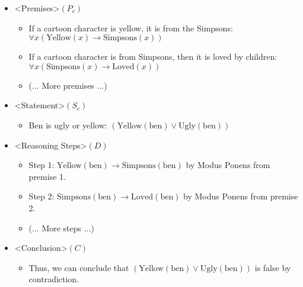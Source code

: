 \documentclass[10pt,a4paper]{article}
\begin{document}
\begin{multicols}{2}
{\begin{minipage}{9cm}
\begin{itemize}
    \item \textless Premises\textgreater $(P_c)$
    \begin{itemize}
        \item If a cartoon character is yellow, it is from the Simpsons: $\forall x (\text{Yellow}(x) \rightarrow \text{Simpsons}(x))$
        \item If a cartoon character is from Simpsons, then it is loved by children: $\forall x (\text{Simpsons}(x) \rightarrow \text{Loved}(x))$
        \item (... More premises ...)
    \end{itemize}
    \item \textless Statement\textgreater $(S_c)$
    \begin{itemize}
        \item Ben is ugly or yellow: $(\text{Yellow}(\text{ben}) \lor \text{Ugly}(\text{ben}))$
    \end{itemize}
    \item \textless Reasoning Steps\textgreater $(D)$
    \begin{itemize}
        \item Step 1: $\text{Yellow}(\text{ben}) \rightarrow \text{Simpsons}(\text{ben})$ by Modus Ponens from premise 1.
        \item Step 2: $\text{Simpsons}(\text{ben}) \rightarrow \text{Loved}(\text{ben})$ by Modus Ponens from premise 2.
        \item (... More steps ...)
    \end{itemize}
    \item \textless Conclusion\textgreater $(C)$
    \begin{itemize}
        \item Thus, we can conclude that $(\text{Yellow}(\text{ben}) \lor \text{Ugly}(\text{ben}))$ is false by contradiction.
    \end{itemize}
\end{itemize}


\end{minipage}}
\end{multicols}
\end{document}
